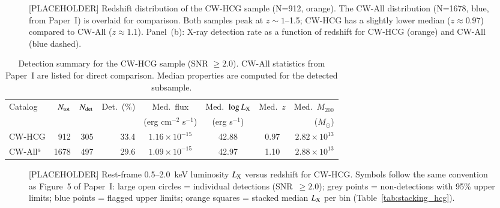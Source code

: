 \documentclass{aa}
\begin{document}

\begin{figure}
\centering
\caption{[PLACEHOLDER] Redshift distribution of the CW-HCG sample (N=912, orange). The CW-All distribution (N=1678, blue, from Paper~I) is overlaid for comparison. Both samples peak at $z \sim 1$--1.5; CW-HCG has a slightly lower median ($z \approx 0.97$) compared to CW-All ($z \approx 1.1$). Panel~(b): X-ray detection rate as a function of redshift for CW-HCG (orange) and CW-All (blue dashed).}
\label{fig:redshift_dist_hcg}
\end{figure}

\begin{table}
\caption{Detection summary for the CW-HCG sample (SNR $\geq 2.0$). CW-All statistics from Paper~I are listed for direct comparison. Median properties are computed for the detected subsample.}
\label{tab:detection_hcg}
\centering
\begin{tabular}{lrrrcccr}
\hline\hline
Catalog & $N_{\rm tot}$ & $N_{\rm det}$ & Det.\ (\%) & Med.\ flux & Med.\ $\log L_{\rm X}$ & Med.\ $z$ & Med.\ $M_{200}$ \\
 & & & & (erg cm$^{-2}$ s$^{-1}$) & (erg s$^{-1}$) & & ($M_{\odot}$) \\
\hline
CW-HCG & 912  & 305 & 33.4 & $1.16\times10^{-15}$ & 42.88 & 0.97 & $2.82\times10^{13}$ \\
CW-All$^{a}$  & 1678 & 497 & 29.6 & $1.09\times10^{-15}$ & 42.97 & 1.10 & $2.88\times10^{13}$ \\
\hline
\end{tabular}
\end{table}

\begin{figure}
\centering
\caption{[PLACEHOLDER] Rest-frame 0.5--2.0~keV luminosity $L_{\rm X}$ versus redshift for CW-HCG. Symbols follow the same convention as Figure~5 of Paper~I: large open circles = individual detections (SNR~$\geq 2.0$); grey points = non-detections with 95\% upper limits; blue points = flagged upper limits; orange squares = stacked median $L_{\rm X}$ per bin (Table~\ref{tab:stacking_hcg}).}
\label{fig:LX_z_hcg}
\end{figure}
\end{document}
